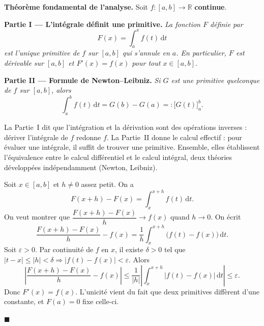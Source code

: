 ﻿%



\begin{tcolorbox}[thmbox]
  \textbf{Théorème fondamental de l'analyse.}\enspace%
  Soit $f : [a,b] \to \mathbb{R}$ \textbf{continue}.

  \medskip
  \textbf{Partie I — L'intégrale définit une primitive.}\enspace%
  \textit{La fonction $F$ définie par}
  \[
    F(x) = \int_a^x f(t)\,\mathrm{d}t
  \]
  \textit{est l'unique primitive de $f$ sur $[a,b]$ qui s'annule en $a$. En particulier,
  $F$ est dérivable sur $[a,b]$ et $F'(x) = f(x)$ pour tout $x \in [a,b]$.}

  \medskip
  \textbf{Partie II — Formule de Newton--Leibniz.}\enspace%
  \textit{Si $G$ est une primitive quelconque de $f$ sur $[a,b]$, alors}
  \[
    \int_a^b f(t)\,\mathrm{d}t = G(b) - G(a) =: \bigl[G(t)\bigr]_a^b.
  \]
\end{tcolorbox}

La Partie~I dit que l'intégration et la dérivation sont des opérations inverses :
dériver l'intégrale de $f$ redonne $f$. La Partie~II donne le calcul effectif :
pour évaluer une intégrale, il suffit de trouver une primitive.
Ensemble, elles établissent l'équivalence entre le calcul différentiel et le calcul
intégral, deux théories développées indépendamment (Newton, Leibniz).

\decsep{}



\begin{mdframed}[style=proofbar]
  Soit $x \in [a,b]$ et $h \neq 0$ assez petit. On a
  \[
    F(x+h) - F(x) = \int_x^{x+h} f(t)\,\mathrm{d}t.
  \]
  On veut montrer que $\dfrac{F(x+h)-F(x)}{h} \to f(x)$ quand $h\to 0$.
  On écrit
  \[
    \frac{F(x+h)-F(x)}{h} - f(x)
    = \frac{1}{h}\int_x^{x+h}\bigl(f(t)-f(x)\bigr)\,\mathrm{d}t.
  \]
  Soit $\varepsilon > 0$. Par continuité de $f$ en $x$, il existe $\delta > 0$ tel que
  $|t-x| \leq |h| < \delta \Rightarrow |f(t)-f(x)| < \varepsilon$. Alors
  \[
    \left|\frac{F(x+h)-F(x)}{h} - f(x)\right|
    \leq \frac{1}{|h|}\left|\int_x^{x+h}|f(t)-f(x)|\,\mathrm{d}t\right| \leq \varepsilon.
  \]
  Donc $F'(x) = f(x)$. L'unicité vient du fait que deux primitives diffèrent
  d'une constante, et $F(a) = 0$ fixe celle-ci.

  \medskip\noindent$\blacksquare$
\end{mdframed}

